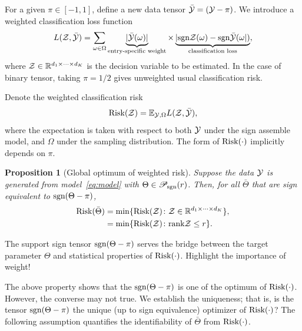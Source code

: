 \documentclass{article}
\theoremstyle{plain}
\newtheorem{prop}{Proposition}
\theoremstyle{definition}
\newcommand*{\KeepStyleUnderBrace}[1]{%
  \mathop{%
    \mathchoice
    {\underbrace{\displaystyle#1}}%
    {\underbrace{\textstyle#1}}%
    {\underbrace{\scriptstyle#1}}%
    {\underbrace{\scriptscriptstyle#1}}%
  }\limits
}
\def\sign{\textup{sgn}}
\def\srank{\textup{srank}}
\def\caliP{\mathscr{P}_{\textup{sgn}}}
\def\risk{\textup{Risk}}
\begin{document}
 For a given $\pi \in [-1,1]$, define a new data tensor $\bar {\mathcal{Y}} = (\mathcal{Y}-\pi)$. We introduce a weighted classification loss function
\[
L(\tZ, \bar \tY)= \sum_{\omega \in \Omega}\KeepStyleUnderBrace{|\bar \tY(\omega)|}_{\text{entry-specific weight}} \times \KeepStyleUnderBrace{| \sign \tZ(\omega)-\sign \bar \tY(\omega|)}_{\text{classification loss}},
\]
where $\mathcal{Z}\in\mathbb{R}^{d_1\times \cdots \times d_K}$ is the decision variable to be estimated. In the case of binary tensor, taking $\pi=1/2$ gives unweighted usual classification risk.


Denote the weighted classification risk 
\begin{equation}\label{eq:population}
\textup{Risk}(\mathcal{Z})=\mathbb{E}_{\mathcal{Y},\Omega}L(\mathcal{Z},\bar{\mathcal{Y}}),
\end{equation}
where the expectation is taken with respect to both $\mathcal{Y}$ under the sign assemble model, and $\Omega$ under the sampling distribution. The form of $\textup{Risk}(\cdot)$ implicitly depends on $\pi$. 
\begin{prop}[Global optimum of weighted risk] Suppose the data $\mathcal{Y}$ is generated from model~\ref{eq:model} with $\Theta \in \caliP(r)$. Then, for all $\bar \Theta$ that are sign equivalent to $\sign(\Theta-\pi)$, 
\begin{align}
\textup{Risk}(\bar \Theta )&=\min\{\textup{Risk}(\mathcal{Z})\colon \mathcal{Z}\in\mathbb{R}^{d_1\times \cdots \times d_K}\},\\
&=\min\{\textup{Risk}(\mathcal{Z})\colon \textup{rank} \mathcal{Z}\leq r\}.
\end{align}
\end{prop}
The support sign tensor $\sign(\Theta-\pi)$ serves the bridge between the target parameter $\Theta$ and statistical properties of $\textup{Risk}(\cdot)$. 
{\color{red} Highlight the importance of weight!}

The above property shows that the $\sign(\Theta-\pi)$ is one of the optimum of $\risk(\cdot)$. However, the converse may not true. We establish the uniqueness; that is, is the tensor $\sign(\Theta-\pi)$ the unique (up to sign equivalence) optimizer of $\risk(\cdot)$? The following assumption quantifies the identifiability of $\bar \Theta$ from $\risk(\cdot)$. 


\end{document}
